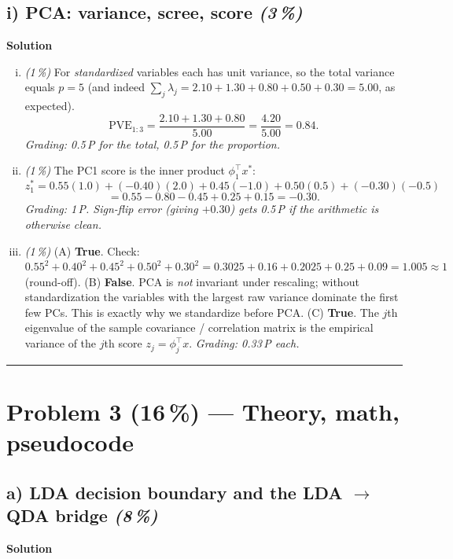 \documentclass[11pt,a4paper]{article}
\newcommand{\points}[1]{\textbf{(#1\,\%)}}
\newcommand{\subpoints}[1]{\textit{(#1\,\%)}}
\newcommand{\sol}{\noindent\textbf{Solution}}
\begin{document}
\subsection*{i) PCA: variance, scree, score \subpoints{3}}
\sol{}
\begin{enumerate}[(i)]
  \item \subpoints{1} For \emph{standardized} variables each has unit variance, so the total
        variance equals $p = 5$ (and indeed $\sum_j \lambda_j = 2.10 + 1.30 + 0.80 + 0.50 + 0.30 = 5.00$,
        as expected).
        $$\text{PVE}_{1{:}3} = \frac{2.10 + 1.30 + 0.80}{5.00} = \frac{4.20}{5.00} = \boxed{0.84}.$$
        \emph{Grading: 0.5\,P for the total, 0.5\,P for the proportion.}

  \item \subpoints{1} The PC1 score is the inner product $\phi_1^\top x^*$:
        $$z_1^* = 0.55(1.0) + (-0.40)(2.0) + 0.45(-1.0) + 0.50(0.5) + (-0.30)(-0.5)$$
        $$= 0.55 - 0.80 - 0.45 + 0.25 + 0.15 = \boxed{-0.30}.$$
        \emph{Grading: 1\,P. Sign-flip error (giving $+0.30$) gets 0.5\,P if the arithmetic is otherwise clean.}

  \item \subpoints{1} (A) \textbf{True}. Check: $0.55^2 + 0.40^2 + 0.45^2 + 0.50^2 + 0.30^2 =
        0.3025 + 0.16 + 0.2025 + 0.25 + 0.09 = 1.005 \approx 1$ (round-off).
        (B) \textbf{False}. PCA is \emph{not} invariant under rescaling; without standardization the
        variables with the largest raw variance dominate the first few PCs. This is exactly why we
        standardize before PCA.
        (C) \textbf{True}. The $j$th eigenvalue of the sample covariance / correlation matrix is the
        empirical variance of the $j$th score $z_j = \phi_j^\top x$.
        \emph{Grading: 0.33\,P each.}
\end{enumerate}

\vspace{0.6em}
\hrule
\vspace{1em}

\section*{Problem 3 \points{16} --- Theory, math, pseudocode}

\subsection*{a) LDA decision boundary and the LDA $\to$ QDA bridge \subpoints{8}}
\sol{}
\end{document}
